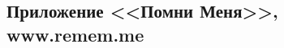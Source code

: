 \documentclass[t,aspectratio=169]{beamer}  %
\begin{document}
\subsection{Приложение <<Помни Меня>>, www.remem.me}
\end{document}

